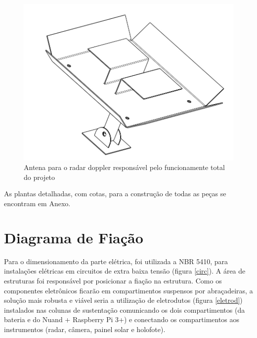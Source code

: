 \begin{figure}[H]
	\centering
    \includegraphics[keepaspectratio=true,scale=0.3]{figuras/antenaradar.jpeg}
    \caption{Antena para o radar doppler responsável pelo funcionamente total do projeto}
    \label{antrad}
\end{figure}

As plantas detalhadas, com cotas, para a construção de todas as peças se encontram em Anexo. 

\section{Diagrama de Fiação}

Para o dimensionamento da parte elétrica, foi utilizada a NBR 5410, para instalações elétricas em circuitos de extra baixa tensão (figura \ref{circ}). A área de estruturas foi responsável por posicionar a fiação na estrutura. Como os componentes eletrônicos ficarão em compartimentos suspensos por abraçadeiras, a solução mais robusta e viável seria a utilização de eletrodutos (figura \ref{eletrod}) instalados nas colunas de sustentação comunicando os dois compartimentos (da bateria e do Nuand + Raspberry Pi 3+) e conectando os compartimentos aos instrumentos (radar, câmera, painel solar e holofote).

